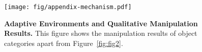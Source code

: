 \begin{figure}[h]
  \texttt{[image: fig/appendix-mechanism.pdf]}
  \caption{\textbf{Adaptive Environments and Qualitative Manipulation Results.} This figure shows the manipulation results of object categories apart from Figure~\ref{fig:fig2}.}
  \label{fig:app_mechanism}
\end{figure}